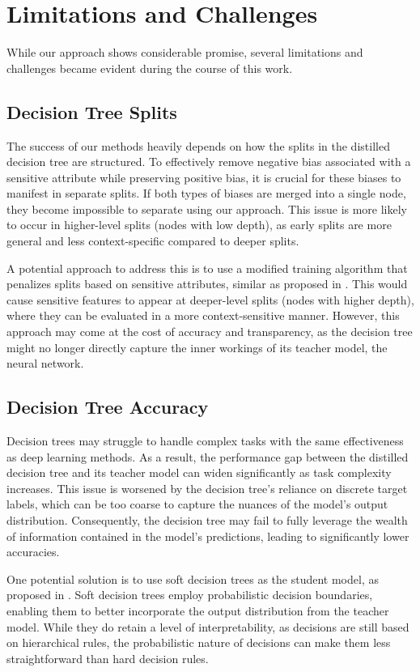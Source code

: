 \section{Limitations and Challenges}
\label{sec:limitations}
While our approach shows considerable promise,
several limitations and challenges became evident during the course of this work. 

\subsection{Decision Tree Splits}
The success of our methods heavily depends on how the splits in the distilled decision tree are structured.  
To effectively remove negative bias associated with a sensitive attribute while preserving positive bias,  
it is crucial for these biases to manifest in separate splits.  
If both types of biases are merged into a single node, they become impossible to separate using our approach.  
This issue is more likely to occur in higher-level splits (nodes with low depth),  
as early splits are more general and less context-specific compared to deeper splits.  

A potential approach to address this is to use a modified training algorithm that penalizes splits based on sensitive attributes,  
similar as proposed in \cite{fairness_decision_tree}.  
This would cause sensitive features to appear at deeper-level splits (nodes with higher depth),
where they can be evaluated in a more context-sensitive manner. 
However, this approach may come at the cost of accuracy and transparency,  
as the decision tree might no longer directly capture the inner workings of its teacher model, the neural network. 

\subsection{Decision Tree Accuracy}
Decision trees may struggle to handle complex tasks with the same effectiveness as deep learning methods.  
As a result, the performance gap between the distilled decision tree and its teacher model
can widen significantly as task complexity increases.
This issue is worsened by the decision tree's reliance on discrete target labels, 
which can be too coarse to capture the nuances of the model's output distribution.
Consequently, the decision tree may fail to fully leverage the wealth of information contained in the model's predictions,
leading to significantly lower accuracies.

One potential solution is to use soft decision trees as the student model, 
as proposed in \cite{soft_decision_tree}.
Soft decision trees employ probabilistic decision boundaries, 
enabling them to better incorporate the output distribution from the teacher model. 
While they do retain a level of interpretability, as decisions are still based on hierarchical rules,
the probabilistic nature of decisions can make them less straightforward than hard decision rules.

